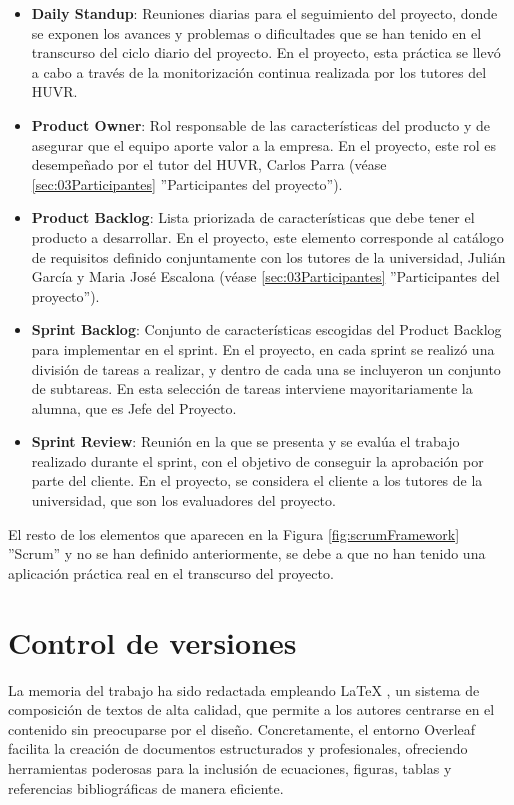 \begin{itemize}
    \item \textbf{Daily Standup}: Reuniones diarias para el seguimiento del proyecto, donde se exponen los avances y problemas o dificultades que se han tenido en el transcurso del ciclo diario del proyecto. En el proyecto, esta práctica se llevó a cabo a través de la monitorización continua realizada por los tutores del HUVR.
    \item \textbf{Product Owner}: Rol responsable de las características del producto y de asegurar que el equipo aporte valor a la empresa. En el proyecto, este rol es desempeñado por el tutor del HUVR, Carlos Parra (véase \ref{sec:03Participantes} ''Participantes del proyecto'').
    \item \textbf{Product Backlog}: Lista priorizada de características que debe tener el producto a desarrollar. En el proyecto, este elemento corresponde al catálogo de requisitos definido conjuntamente con los tutores de la universidad, Julián García y Maria José Escalona (véase \ref{sec:03Participantes} ''Participantes del proyecto'').
    \item \textbf{Sprint Backlog}: Conjunto de características escogidas del Product Backlog para implementar en el sprint. En el proyecto, en cada sprint se realizó una división de tareas a realizar, y dentro de cada una se incluyeron un conjunto de subtareas. En esta selección de tareas interviene mayoritariamente la alumna, que es Jefe del Proyecto.
    \item \textbf{Sprint Review}: Reunión en la que se presenta y se evalúa el trabajo realizado durante el sprint, con el objetivo de conseguir la aprobación por parte del cliente. En el proyecto, se considera el cliente a los tutores de la universidad, que son los evaluadores del proyecto.
\end{itemize}

El resto de los elementos que aparecen en la Figura \ref{fig:scrumFramework} ''Scrum'' y no se han definido anteriormente, se debe a que no han tenido una aplicación práctica real en el transcurso del proyecto.

\section{Control de versiones} \label{sec:04cvs}

La memoria del trabajo ha sido redactada empleando LaTeX \cite{latex}, un sistema de composición de textos de alta calidad, que permite a los autores centrarse en el contenido sin preocuparse por el diseño. Concretamente, el entorno Overleaf facilita la creación de documentos estructurados y profesionales, ofreciendo herramientas poderosas para la inclusión de ecuaciones, figuras, tablas y referencias bibliográficas de manera eficiente.

